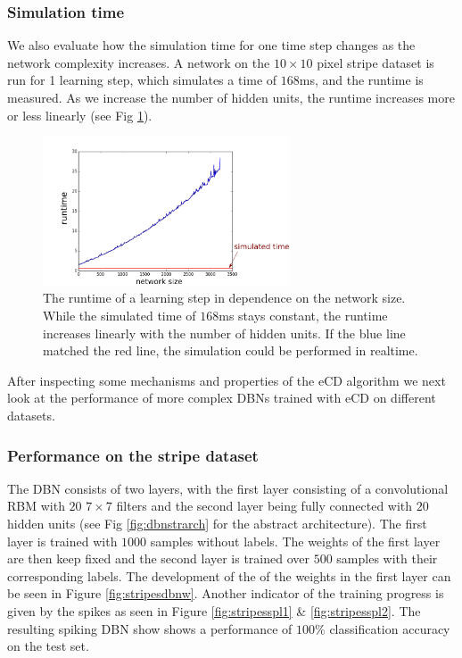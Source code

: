 \subsubsection{Simulation time} \label{c:simtimeexp}

We also evaluate how the simulation time for one time step changes as the network complexity increases.
A network on the $10 \times 10$ pixel stripe dataset is run for 1 learning step, which simulates a time of $168$ms, and the runtime is measured.
As we increase the number of hidden units, the runtime increases more or less linearly (see Fig \ref{fig:simtime}).

\begin{figure}[h!]
	\centering
    	\includegraphics[width=0.65\textwidth]{imgs/runtime-1.png} 
    \caption[The runtime of a learning step in dependence on the network size.]{The runtime of a learning step in dependence on the network size. While the simulated time of $168$ms stays constant, the runtime increases linearly with the number of hidden units. If the blue line matched the red line, the simulation could be performed in realtime.}
	\label{fig:simtime}
\end{figure}

After inspecting some mechanisms and properties of the eCD algorithm we next look at the performance of more complex DBNs trained with eCD on different datasets.

\subsubsection{Performance on the stripe dataset} \label{c:stripeexp}

The DBN consists of two layers, with the first layer consisting of a convolutional RBM with $20$ $7 \times 7$ filters and the second layer being fully connected with $20$ hidden units (see Fig \ref{fig:dbnstrarch} for the abstract architecture).
The first layer is trained with $1000$ samples without labels.
The weights of the first layer are then keep fixed and the second layer is trained over $500$ samples with their corresponding labels.
The development of the of the weights in the first layer can be seen in Figure \ref{fig:stripesdbnw}.
Another indicator of the training progress is given by the spikes as seen in Figure \ref{fig:stripesspl1} \& \ref{fig:stripesspl2}.
The resulting spiking DBN show shows a performance of $100 \%$ classification accuracy on the test set. 

